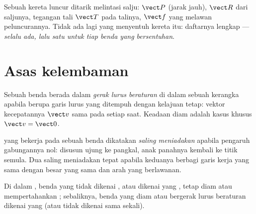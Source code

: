 \begin{example}\label{ex:g10:inertia:sled}
Sebuah kereta luncur ditarik melintasi salju:  $\vect P$ (jarak
jauh),  $\vect R$ dari saljunya, tegangan tali $\vect T$ pada
talinya,  $\vect f$ yang melawan peluncurannya. Tidak ada lagi
yang menyentuh kereta itu: daftarnya lengkap --- \emph{ selalu ada,
lalu satu  untuk tiap benda yang bersentuhan}.
\end{example}

\section{Asas kelembaman}

\begin{definition}\label{def:g10:inertia:uniform}
Sebuah benda berada dalam \emph{gerak lurus beraturan} di dalam sebuah kerangka apabila  berupa garis
lurus yang ditempuh dengan kelajuan tetap: vektor kecepatannya $\vect v$
sama pada setiap saat. Keadaan diam adalah kasus khusus
$\vect v = \vect 0$.
\end{definition}

\begin{definition}\label{def:g10:inertia:compensate}
 yang bekerja pada sebuah benda dikatakan \emph{saling
meniadakan} apabila pengaruh gabungannya
nol: disusun ujung ke pangkal, anak panahnya kembali ke titik semula.
Dua  saling meniadakan tepat apabila keduanya berbagi garis kerja
yang sama dengan besar yang sama dan arah yang berlawanan.
\end{definition}

\begin{theorem}\label{thm:g10:inertia:principle}
Di dalam , benda yang tidak dikenai , atau dikenai
 yang , tetap diam atau mempertahankan ; sebaliknya, benda yang diam atau bergerak lurus beraturan
dikenai  yang  (atau tidak dikenai  sama
sekali).
\end{theorem}
\admitted

